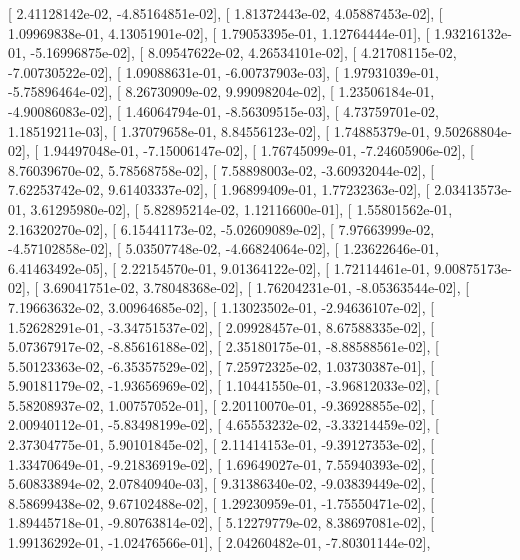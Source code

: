 \documentclass{article}
\begin{document}
       [  2.41128142e-02,  -4.85164851e-02],
       [  1.81372443e-02,   4.05887453e-02],
       [  1.09969838e-01,   4.13051901e-02],
       [  1.79053395e-01,   1.12764444e-01],
       [  1.93216132e-01,  -5.16996875e-02],
       [  8.09547622e-02,   4.26534101e-02],
       [  4.21708115e-02,  -7.00730522e-02],
       [  1.09088631e-01,  -6.00737903e-03],
       [  1.97931039e-01,  -5.75896464e-02],
       [  8.26730909e-02,   9.99098204e-02],
       [  1.23506184e-01,  -4.90086083e-02],
       [  1.46064794e-01,  -8.56309515e-03],
       [  4.73759701e-02,   1.18519211e-03],
       [  1.37079658e-01,   8.84556123e-02],
       [  1.74885379e-01,   9.50268804e-02],
       [  1.94497048e-01,  -7.15006147e-02],
       [  1.76745099e-01,  -7.24605906e-02],
       [  8.76039670e-02,   5.78568758e-02],
       [  7.58898003e-02,  -3.60932044e-02],
       [  7.62253742e-02,   9.61403337e-02],
       [  1.96899409e-01,   1.77232363e-02],
       [  2.03413573e-01,   3.61295980e-02],
       [  5.82895214e-02,   1.12116600e-01],
       [  1.55801562e-01,   2.16320270e-02],
       [  6.15441173e-02,  -5.02609089e-02],
       [  7.97663999e-02,  -4.57102858e-02],
       [  5.03507748e-02,  -4.66824064e-02],
       [  1.23622646e-01,   6.41463492e-05],
       [  2.22154570e-01,   9.01364122e-02],
       [  1.72114461e-01,   9.00875173e-02],
       [  3.69041751e-02,   3.78048368e-02],
       [  1.76204231e-01,  -8.05363544e-02],
       [  7.19663632e-02,   3.00964685e-02],
       [  1.13023502e-01,  -2.94636107e-02],
       [  1.52628291e-01,  -3.34751537e-02],
       [  2.09928457e-01,   8.67588335e-02],
       [  5.07367917e-02,  -8.85616188e-02],
       [  2.35180175e-01,  -8.88588561e-02],
       [  5.50123363e-02,  -6.35357529e-02],
       [  7.25972325e-02,   1.03730387e-01],
       [  5.90181179e-02,  -1.93656969e-02],
       [  1.10441550e-01,  -3.96812033e-02],
       [  5.58208937e-02,   1.00757052e-01],
       [  2.20110070e-01,  -9.36928855e-02],
       [  2.00940112e-01,  -5.83498199e-02],
       [  4.65553232e-02,  -3.33214459e-02],
       [  2.37304775e-01,   5.90101845e-02],
       [  2.11414153e-01,  -9.39127353e-02],
       [  1.33470649e-01,  -9.21836919e-02],
       [  1.69649027e-01,   7.55940393e-02],
       [  5.60833894e-02,   2.07840940e-03],
       [  9.31386340e-02,  -9.03839449e-02],
       [  8.58699438e-02,   9.67102488e-02],
       [  1.29230959e-01,  -1.75550471e-02],
       [  1.89445718e-01,  -9.80763814e-02],
       [  5.12279779e-02,   8.38697081e-02],
       [  1.99136292e-01,  -1.02476566e-01],
       [  2.04260482e-01,  -7.80301144e-02],
\end{document}
